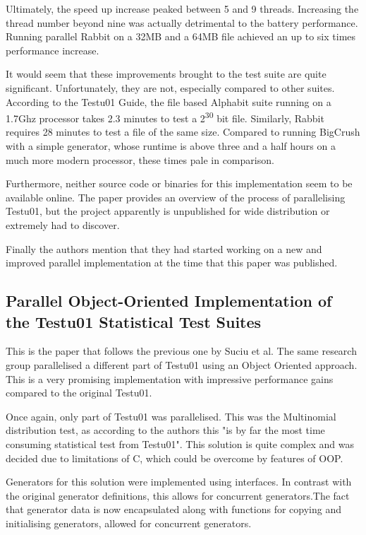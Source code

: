 Ultimately, the speed up increase peaked between 5 and 9 threads. Increasing the thread number beyond nine was actually detrimental to the battery performance. Running parallel Rabbit on a 32MB and a 64MB file achieved an up to six times performance increase.

It would seem that these improvements brought to the test suite are quite significant. Unfortunately, they are not, especially compared to other suites. According to the Testu01 Guide, the file based Alphabit suite running on a 1.7Ghz processor takes 2.3 minutes to test a 2\textsuperscript{30} bit file. Similarly, Rabbit requires 28 minutes to test a file of the same size. Compared to running BigCrush with a simple generator, whose runtime is above three and a half hours on a much more modern processor, these times pale in comparison.

Furthermore, neither source code or binaries for this implementation seem to be available online. The paper provides an overview of the process of parallelising Testu01, but the project apparently is unpublished for wide distribution or extremely had to discover.

Finally the authors mention that they had started working on a new and improved parallel implementation at the time that this paper was published.

\subsection{Parallel Object-Oriented Implementation of the Testu01 Statistical Test Suites}
This is the paper that follows the previous one by Suciu et al. The same research group parallelised a different part of Testu01 using an Object Oriented approach. This is a very promising implementation with impressive performance gains compared to the original Testu01.

Once again, only part of Testu01 was parallelised. This was the Multinomial distribution test, as according to the authors this "is by far the most time consuming statistical test from Testu01". This solution is quite complex and was decided due to limitations of C, which could be overcome by features of OOP.

Generators for this solution were implemented using interfaces. In contrast with the original generator definitions, this allows for concurrent generators.The fact that generator data is now encapsulated along with functions for copying and initialising generators, allowed for concurrent generators.

